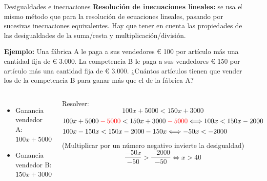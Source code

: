 \documentclass[9pt, aspectratio=169]{beamer}
\begin{document}
\begin{frame}{Desigualdades e inecuaciones}
\textbf{Resolución de inecuaciones lineales:} se usa el mismo método que para la resolución de ecuaciones lineales, pasando por sucesivas inecuaciones equivalentes. Hay que tener en cuenta las propiedades de las desigualdades de la suma/resta y multiplicación/división.

\textbf{Ejemplo:} Una fábrica A le paga a sus vendedores € 100 por artículo más una cantidad fija de € 3.000. La competencia B le paga a sus vendedores € 150 por artículo más una cantidad fija de € 3.000. ¿Cuántos artículos tienen que vender los de la competencia B para ganar más que el de la fábrica A?
\begin{columns}
\begin{itemize}
    \item Ganancia vendedor A: $100 x + 5000$
    \item Ganancia vendedor B: $150 x + 3000$
\end{itemize}
Resolver:
\[ 100 x + 5000 < 150 x + 3000 \]
\begin{align*}
100 &x + 5000 \mathcolor{red}{-5000} < 150 x + 3000 \mathcolor{red}{ -5000 } \Longleftrightarrow 100 x < 150 x - 2000 \\
100 &x - 150 x < 150x - 2000 - 150x \Longleftrightarrow -50 x < -2000
\end{align*}
(Multiplicar por un número negativo invierte la desigualdad)
\[ \frac{-50 x}{-50} > \frac{-2000}{-50} \Longleftrightarrow x > 40 \]
\end{columns}
\end{frame}
\end{document}
